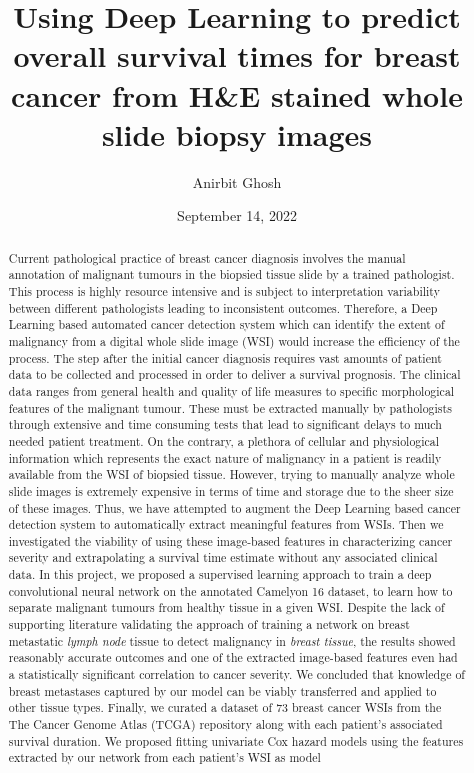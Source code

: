 \documentclass{l4proj}
\begin{document}
\title{Using Deep Learning to predict overall survival times for breast cancer from H\&E stained whole slide biopsy images}
\author{Anirbit Ghosh}
\date{September 14, 2022}

\maketitle

\begin{abstract}
    Current pathological practice of breast cancer diagnosis involves the manual annotation of malignant tumours in the biopsied tissue slide by a trained pathologist. This process is highly resource intensive and is subject to interpretation variability between different pathologists leading to inconsistent outcomes. Therefore, a Deep Learning based automated cancer detection system which can identify the extent of malignancy from a digital whole slide image (WSI) would increase the efficiency of the process. The step after the initial cancer diagnosis requires vast amounts of patient data to be collected and processed in order to deliver a survival prognosis. The clinical data ranges from general health and quality of life measures to specific morphological features of the malignant tumour. These must be extracted manually by pathologists through extensive and time consuming tests that lead to significant delays to much needed patient treatment. On the contrary, a plethora of cellular and physiological information which represents the exact nature of malignancy in a patient is readily available from the WSI of biopsied tissue. However, trying to manually analyze whole slide images is extremely expensive in terms of time and storage due to the sheer size of these images. Thus, we have attempted to augment the Deep Learning based cancer detection system to automatically extract meaningful features from WSIs. Then we investigated the viability of using these image-based features in characterizing cancer severity and extrapolating a survival time estimate without any associated clinical data. In this project, we proposed a supervised learning approach to train a deep convolutional neural network on the annotated Camelyon 16 dataset, to learn how to separate malignant tumours from healthy tissue in a given WSI. Despite the lack of supporting literature validating the approach of training a network on breast metastatic \textit{lymph node} tissue to detect malignancy in \textit{breast tissue}, the results showed reasonably accurate outcomes and one of the extracted image-based features even had a statistically significant correlation to cancer severity. We concluded that knowledge of breast metastases captured by our model can be viably transferred and applied to other tissue types. Finally, we curated a dataset of 73 breast cancer WSIs from the The Cancer Genome Atlas (TCGA) repository along with each patient's associated survival duration. We proposed fitting univariate Cox hazard models using the features extracted by our network from each patient's WSI as model 
\end{abstract}
\end{document}
